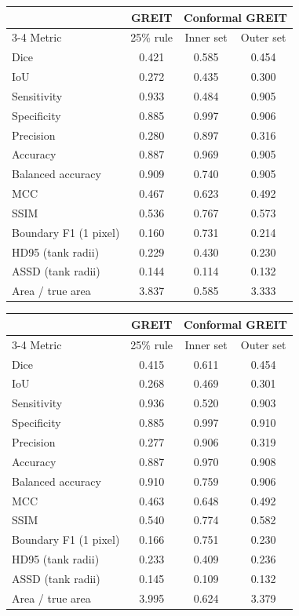 \begin{tabular}{lccc}
\toprule
 & GREIT & \multicolumn{2}{c}{Conformal GREIT}\\
\cmidrule(lr){3-4}
Metric & 25\% rule & Inner set & Outer set\\
\midrule
Dice & 0.421 & 0.585 & 0.454\\
IoU & 0.272 & 0.435 & 0.300\\
Sensitivity & 0.933 & 0.484 & 0.905\\
Specificity & 0.885 & 0.997 & 0.906\\
Precision & 0.280 & 0.897 & 0.316\\
Accuracy & 0.887 & 0.969 & 0.905\\
Balanced accuracy & 0.909 & 0.740 & 0.905\\
MCC & 0.467 & 0.623 & 0.492\\
SSIM & 0.536 & 0.767 & 0.573\\
Boundary F1 (1 pixel) & 0.160 & 0.731 & 0.214\\
HD95 (tank radii) & 0.229 & 0.430 & 0.230\\
ASSD (tank radii) & 0.144 & 0.114 & 0.132\\
Area / true area & 3.837 & 0.585 & 3.333\\
\bottomrule
\end{tabular}

\begin{tabular}{lccc}
\toprule
 & GREIT & \multicolumn{2}{c}{Conformal GREIT}\\
\cmidrule(lr){3-4}
Metric & 25\% rule & Inner set & Outer set\\
\midrule
Dice & 0.415 & 0.611 & 0.454\\
IoU & 0.268 & 0.469 & 0.301\\
Sensitivity & 0.936 & 0.520 & 0.903\\
Specificity & 0.885 & 0.997 & 0.910\\
Precision & 0.277 & 0.906 & 0.319\\
Accuracy & 0.887 & 0.970 & 0.908\\
Balanced accuracy & 0.910 & 0.759 & 0.906\\
MCC & 0.463 & 0.648 & 0.492\\
SSIM & 0.540 & 0.774 & 0.582\\
Boundary F1 (1 pixel) & 0.166 & 0.751 & 0.230\\
HD95 (tank radii) & 0.233 & 0.409 & 0.236\\
ASSD (tank radii) & 0.145 & 0.109 & 0.132\\
Area / true area & 3.995 & 0.624 & 3.379\\
\bottomrule
\end{tabular}

